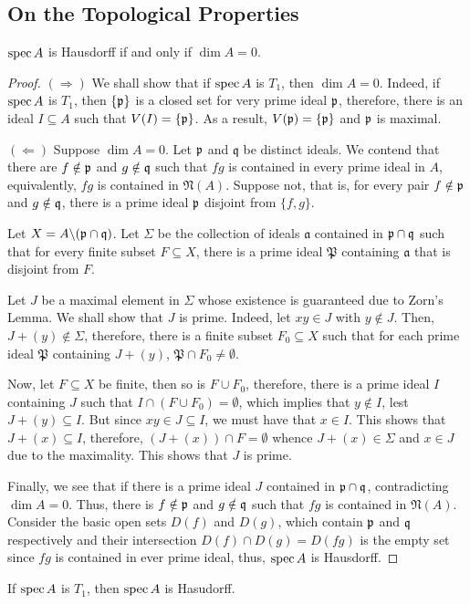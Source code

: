 \subsection{On the Topological Properties}
\begin{proposition}
    $\operatorname{spec} A$ is Hausdorff if and only if $\dim A = 0$.
\end{proposition}
\begin{proof} 
$(\Longrightarrow)$ We shall show that if $\operatorname{spec} A$ is $T_1$, then $\dim A = 0$. Indeed, if $\operatorname{spec} A$ is $T_1$, then $\{\mathfrak p\}$ is a closed set for very prime ideal $\mathfrak p$, therefore, there is an ideal $I\subseteq A$ such that $V(I) = \{\mathfrak p\}$. As a result, $V(\mathfrak p) = \{\mathfrak p\}$ and $\mathfrak p$ is maximal.

$(\Longleftarrow)$ Suppose $\dim A = 0$. Let $\mathfrak p$ and $\mathfrak q$ be distinct ideals. We contend that there are $f\notin\mathfrak p$ and $g\notin\mathfrak q$ such that $fg$ is contained in every prime ideal in $A$, equivalently, $fg$ is contained in $\mathfrak N(A)$. Suppose not, that is, for every pair $f\notin\mathfrak p$ and $g\notin\mathfrak q$, there is a prime ideal $\mathfrak p$ disjoint from $\{f,g\}$.

Let $X = A\backslash(\mathfrak p\cap\mathfrak q)$. Let $\Sigma$ be the collection of ideals $\mathfrak a$ contained in $\mathfrak p\cap\mathfrak q$ such that for every finite subset $F\subseteq X$, there is a prime ideal $\mathfrak P$ containing $\mathfrak a$ that is disjoint from $F$.

Let $J$ be a maximal element in $\Sigma$ whose existence is guaranteed due to Zorn's Lemma. We shall show that $J$ is prime. Indeed, let $xy\in J$ with $y\notin J$. Then, $J + (y)\notin\Sigma$, therefore, there is a finite subset $F_0\subseteq X$ such that for each prime ideal $\mathfrak P$ containing $J + (y)$, $\mathfrak P\cap F_0\ne\emptyset$.

Now, let $F\subseteq X$ be finite, then so is $F\cup F_0$, therefore, there is a prime ideal $I$ containing $J$ such that $I\cap(F\cup F_0) = \emptyset$, which implies that $y\notin I$, lest $J + (y)\subseteq I$. But since $xy\in J\subseteq I$, we must have that $x\in I$. This shows that $J + (x)\subseteq I$, therefore, $(J + (x))\cap F = \emptyset$ whence $J + (x)\in\Sigma$ and $x\in J$ due to the maximality. This shows that $J$ is prime.

Finally, we see that if there is a prime ideal $J$ contained in $\mathfrak p\cap\mathfrak q$, contradicting $\dim A = 0$. Thus, there is $f\notin\mathfrak p$ and $g\notin\mathfrak q$ such that $fg$ is contained in $\mathfrak N(A)$. Consider the basic open sets $D(f)$ and $D(g)$, which contain $\mathfrak p$ and $\mathfrak q$ respectively and their intersection $D(f)\cap D(g) = D(fg)$ is the empty set since $fg$ is contained in ever prime ideal, thus, $\operatorname{spec} A$ is Hausdorff.
\end{proof}

\begin{corollary}
    If $\operatorname{spec} A$ is $T_1$, then $\operatorname{spec} A$ is Hasudorff.
\end{corollary}

